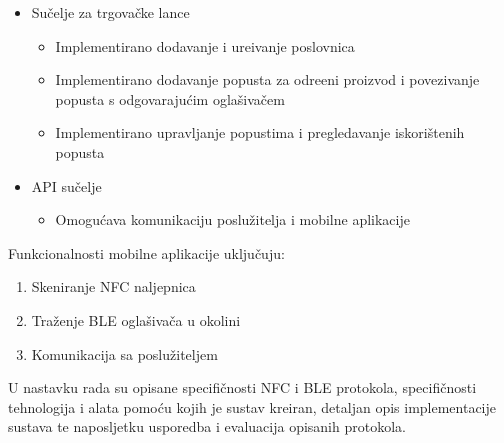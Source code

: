 \begin{itemize}
	\item Su\v{c}elje za trgova\v{c}ke lance
	\begin{itemize}
		\item Implementirano dodavanje i ure\dj ivanje poslovnica
		\item Implementirano dodavanje popusta za odre\dj eni proizvod i povezivanje popusta s odgovaraju\'{c}im ogla\v{s}iva\v{c}em
		\item Implementirano upravljanje popustima i pregledavanje iskori\v{s}tenih popusta
	\end{itemize}
	\item API su\v{c}elje
	
	\begin{itemize}
		\item Omogu\'{c}ava komunikaciju poslu\v{z}itelja i mobilne aplikacije
	\end{itemize}
\end{itemize}

Funkcionalnosti mobilne aplikacije uklju\v{c}uju:
\begin{enumerate}
	\item Skeniranje NFC naljepnica
	\item Tra\v{z}enje BLE ogla\v{s}iva\v{c}a u okolini
	\item Komunikacija sa poslu\v{z}iteljem
\end{enumerate}

U nastavku rada su opisane specifi\v{c}nosti NFC i BLE protokola, specifi\v{c}nosti tehnologija i alata pomo\'{c}u kojih je sustav kreiran, detaljan opis implementacije sustava te naposljetku usporedba i evaluacija opisanih protokola.

